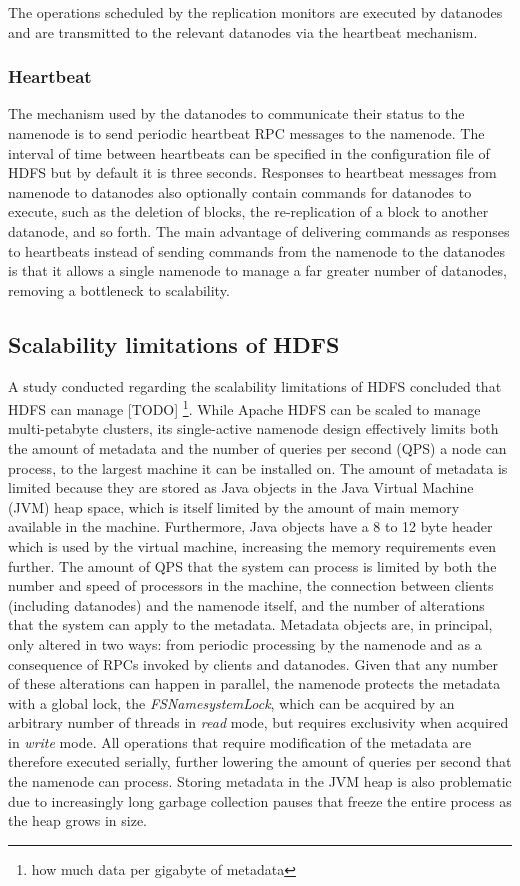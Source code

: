The operations scheduled by the replication monitors are executed by datanodes and are transmitted to the relevant datanodes via the heartbeat mechanism.

\subsubsection{Heartbeat}
\label{sec:heartbeat}
The mechanism used by the datanodes to communicate their status to the namenode is to send periodic heartbeat RPC messages to the namenode.
The interval of time between heartbeats can be specified in the configuration file of HDFS but by default it is three seconds.
Responses to heartbeat messages from namenode to datanodes also optionally contain commands for datanodes to execute, such as the deletion of blocks, the re-replication of a block to another datanode, and so forth.
The main advantage of delivering commands as responses to heartbeats instead of sending commands from the namenode to the datanodes is that it allows a single namenode to manage a far greater number of datanodes, removing a bottleneck to scalability.

\subsection{Scalability limitations of HDFS}
\label{sec:scalability-limitations}
A study conducted regarding the scalability limitations of HDFS \cite{shvachko2010hdfs} concluded that HDFS can manage [TODO] \footnote{how much data per gigabyte of metadata}.
While Apache HDFS can be scaled to manage multi-petabyte clusters, its single-active namenode design effectively limits both the amount of metadata and the number of queries per second (QPS) a node can process, to the largest machine it can be installed on.
The amount of metadata is limited because they are stored as Java objects in the Java Virtual Machine (JVM) heap space, which is itself limited by the amount of main memory available in the machine.
Furthermore, Java objects have a 8 to 12 byte header which is used by the virtual machine, increasing the memory requirements even further.
The amount of QPS that the system can process is limited by both the number and speed of processors in the machine, the connection between clients (including datanodes) and the namenode itself, and the number of alterations that the system can apply to the metadata.
Metadata objects are, in principal, only altered in two ways: from periodic processing by the namenode and as a consequence of RPCs invoked by clients and datanodes.
Given that any number of these alterations can happen in parallel, the namenode protects the metadata with a global lock, the \textit{FSNamesystemLock}, which can be acquired by an arbitrary number of threads in \emph{read} mode, but requires exclusivity when acquired in \emph{write} mode.
All operations that require modification of the metadata are therefore executed serially, further lowering the amount of queries per second that the namenode can process.
Storing metadata in the JVM heap is also problematic due to increasingly long garbage collection pauses that freeze the entire process as the heap grows in size.
